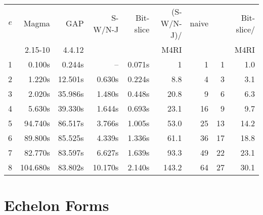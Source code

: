 \documentclass{sig-alternate}
\newcommand{\ring}[1]{\mathbb{#1}}
\newcommand{\F}{\ensuremath{\ring{F}}\xspace}
\newcommand{\mycomputer}{2.66~Ghz Intel i7\xspace}
\begin{document}
\begin{table*}[ht]
\begin{small}
\begin{center}
\begin{tabular}{|r||r|r||r|r|r|r|r||r|}
\hline
 $e$ & Magma & GAP & S-W/N-J & Bit-slice	& (S-W/N-J)/ &	naive	 & \cite{M05} & Bit-slice/\\
     & {\footnotesize 2.15-10} & {\footnotesize 4.4.12} & & & M4RI & &  & M4RI\\
\hline
 1 &   0.100s &  0.244s &      -- & 0.071s &     1 &  1 &  1 &  1.0\\
 2 &   1.220s & 12.501s &  0.630s & 0.224s &   8.8 &  4 &  3 &  3.1\\ %
 3 &   2.020s & 35.986s &  1.480s & 0.448s &  20.8 &  9 &  6 &  6.3\\ %
 4 &   5.630s & 39.330s &  1.644s & 0.693s &  23.1 & 16 &  9 &  9.7\\ %
 5 &  94.740s & 86.517s &  3.766s & 1.005s &  53.0 & 25 & 13 & 14.2\\ %
 6 &  89.800s & 85.525s &  4.339s & 1.336s &  61.1 & 36 & 17 & 18.8\\ %
 7 &  82.770s & 83.597s &  6.627s & 1.639s &  93.3 & 49 & 22 & 23.1\\ %
 8 & 104.680s & 83.802s & 10.170s & 2.140s & 143.2 & 64 & 27 & 30.1\\ %
\hline
\end{tabular}
\caption{Multiplication of $4,000 \times 4,000$ matrices over $\F_{2^e}$ on \mycomputer.}
\label{tab:karatsuba_mat_mul_times}
\end{center}
\end{small}
\end{table*}

\section{Echelon Forms} \label{sec:echelon}
\end{document}

